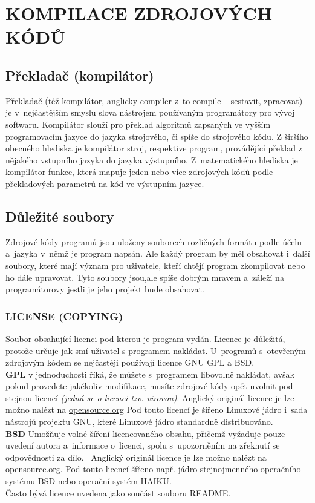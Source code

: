 \documentclass[a4paper,12pt]{article}
\newcommand{\upc}[1]{\uppercase{#1}} %
\renewcommand{\b}[1]{\textbf{#1}} %
\renewcommand{\it}[1]{\textit{#1}}		%
\begin{document}
\section{\upc{Kompilace zdrojových kódů}}
\subsection{Překladač (kompilátor)}
Překladač (též kompilátor, anglicky compiler z~to compile – sestavit, zpracovat) je v~nejčastějším smyslu slova nástrojem používaným programátory pro vývoj softwaru. Kompilátor slouží pro překlad algoritmů zapsaných ve vyšším programovacím jazyce do jazyka strojového, či spíše do strojového kódu. Z širšího obecného hlediska je kompilátor stroj, respektive program, provádějící překlad z nějakého vstupního jazyka do jazyka výstupního. Z~matematického hlediska je kompilátor funkce, která mapuje jeden nebo více zdrojových kódů podle překladových parametrů na kód ve výstupním jazyce.~\cite{Wkom}
\subsection{Důležité soubory}
Zdrojové kódy programů jsou uloženy souborech rozličných formátu podle účelu a~jazyka v~němž je program napsán. Ale každý program by měl obsahovat i~další soubory, které mají význam pro uživatele, kteří chtějí program zkompilovat nebo ho dále upravovat. Tyto soubory jsou,ale spíše dobrým mravem a~záleží na programátorovy jestli je jeho projekt bude obsahovat.
\subsubsection{LICENSE (COPYING)}
Soubor obsahující licenci pod kterou je program vydán. Licence je důležitá, protože určuje jak smí uživatel s programem nakládat. U~programů s~otevřeným zdrojovým kódem se nejčastěji používají licence GNU GPL a BSD.\\ \b{GPL} v jednoduchosti říká, že můžete s~programem libovolně nakládat, avšak pokud provedete jakékoliv modifikace, musíte zdrojové kódy opět uvolnit pod stejnou licencí \it{(jedná se o licenci tzv. virovou)}. Anglický originál licence je lze možno nalézt na \href{http://www.opensource.org/licenses/gpl-3.0}{opensource.org} Pod touto licencí je šířeno Linuxové jádro i~sada nástrojů projektu GNU, které Linuxové jádro standardně distribuováno.\\ \b{BSD} Umožňuje volné šíření licencovaného obsahu, přičemž vyžaduje pouze uvedení autora a~informace o~licenci, spolu s~upozorněním na zřeknutí se odpovědnosti za dílo.~\cite{BSDL} Anglický originál licence je lze možno nalézt na \href{http://www.opensource.org/licenses/bsd-license.php}{opensource.org}. Pod touto licencí šířeno např. jádro stejnojmenného operačního systému BSD nebo operační systém HAIKU.\\
Často bývá licence uvedena jako součást souboru README.
\end{document}
